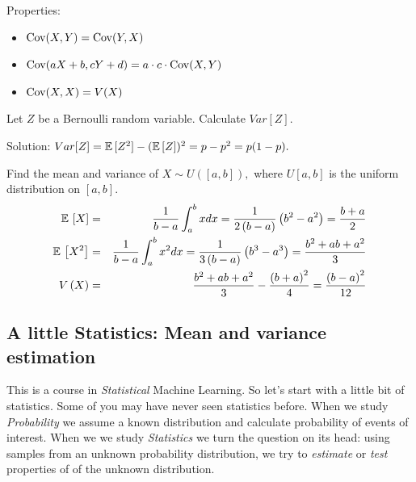 Properties:
\begin{itemize}
\item $\mathrm{Cov}(X,Y)=\mathrm{Cov}(Y,X)$
\item $\mathrm{Cov}(aX+b,cY+d) = a \cdot c \cdot \mathrm{Cov}(X,Y)$
\item $\mathrm{Cov}(X,X)=V(X)$
\end{itemize}

\begin{exercise}
Let $Z$ be a Bernoulli random variable. Calculate $Var[Z].$
\end{exercise}
Solution: $Var[Z] = \mathbb{E}\,[Z^2] - (\mathbb{E}\,[Z])^2 = p-p^2=p(1-p).$


\begin{example}
Find the mean and variance of $X\sim U\left(\left[a,b\right]\right),$ where $U[a,b]$ is the uniform distribution on $[a,b].$
\begin{eqnarray*}
\mathbb{E}\,\left[X\right] & = & \frac{1}{b-a}\int_{a}^{b}xdx=\frac{1}{2\left(b-a\right)}\left(b^{2}-a^{2}\right)=\frac{b+a}{2}\\
\mathbb{E}\,\left[X^{2}\right] & = & \frac{1}{b-a}\int_{a}^{b}x^{2}dx=\frac{1}{3\left(b-a\right)}\left(b^{3}-a^{3}\right)=\frac{b^{2}+ab+a^{2}}{3}\\
V\left(X\right) & = & \frac{b^{2}+ab+a^{2}}{3}-\frac{\left(b+a\right)^{2}}{4}=\frac{\left(b-a\right)^{2}}{12}
\end{eqnarray*}
\end{example}

\subsection{A little Statistics: Mean and variance estimation}

This is a course in {\em Statistical} Machine Learning. So let's start with a little bit of statistics. Some of you may have never seen statistics before. 
When we study {\em Probability} we assume a known distribution and calculate probability of events of interest. When we we study {\em Statistics} we turn the question on its head: using samples from an unknown probability distribution, we try to {\em estimate} or {\em test} properties of of the unknown distribution. 

